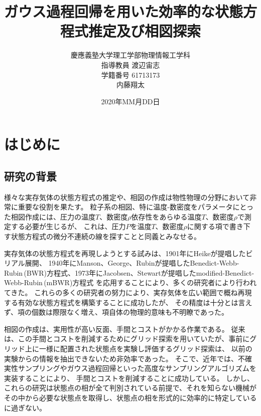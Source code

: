 \documentclass[titlepage]{jsreport}
\title{ガウス過程回帰を用いた効率的な状態方程式推定及び相図探索}
\author{慶應義塾大学理工学部物理情報工学科\\
指導教員 渡辺宙志\\
学籍番号 61713173\\
内藤翔太}
\date{2020年MM月DD日}
\begin{document}
\maketitle

\tableofcontents

\chapter{はじめに} \label{chap:introduction}

\section{研究の背景} \label{intro-background}
様々な実存気体の状態方程式の推定や、相図の作成は物性物理の分野において非常に重要な役割を果たす。
粒子系の相図、特に温度-数密度をパラメータにとった相図作成には、圧力の温度$T$、数密度$\rho$依存性をあらゆる温度$T$、数密度$\rho$で測定する必要が生じるが、
これは、圧力$P$を温度$T$、数密度$\rho$に関する項で書き下す状態方程式の微分不連続の線を探すことと同義とみなせる。

実存気体の状態方程式を再現しようとする試みは、1901年にHeikeが提唱したビリアル展開\cite{virial-Heike}、
1940年にManson、George、Rubinが提唱したBenedict-Webb-Rubin\,(BWR)方程式\cite{BWR-equation:original}、1973年にJacobsen、Stewartが提唱したmodified-Benedict-Webb-Rubin\,(mBWR)方程式\cite{m-BWR-equation}
を応用することにより、多くの研究者により行われてきた\cite{MCCARTY1974276,BWR-equation:13,BWR-equation:25}。
これらの多くの研究者の努力により、実存気体を広い範囲で概ね再現する有効な状態方程式を構築することに成功したが、
その精度は十分とは言えず、項の個数は際限なく増え、項自体の物理的意味も不明瞭であった。

相図の作成は、実用性が高い反面、手間とコストがかかる作業である。
従来は、この手間とコストを削減するためにグリッド探索\cite{grid1,grid2}を用いていたが、事前にグリッド上に一様に配置された状態点を実験し評価するグリッド探索は、
以前の実験からの情報を抽出できないため非効率であった。
そこで、近年では、不確実性サンプリング\cite{uncertainty-sampling1,uncertainty-sampling2}やガウス過程回帰\cite{gaussian-phase}といった高度なサンプリングアルゴリズムを実装することにより、
手間とコストを削減することに成功している。
しかし、これらの研究は状態点の相が全て判別されている前提で、それを知らない機械がその中から必要な状態点を取得し、状態点の相を形式的に効率的に特定しているに過ぎない。
\end{document}

